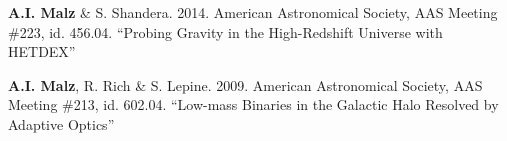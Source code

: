 \begin{list}{}{\malzlist}
	\item {\bf A.I. Malz} \& S. Shandera. 2014. American Astronomical Society, AAS Meeting \#223, id. 456.04. ``Probing Gravity in the High-Redshift Universe with HETDEX'' 
	
	\item {\bf A.I. Malz}, R. Rich \& S. Lepine. 2009. American Astronomical Society, AAS Meeting \#213, id. 602.04. ``Low-mass Binaries in the Galactic Halo Resolved by Adaptive Optics'' 
\end{list}
